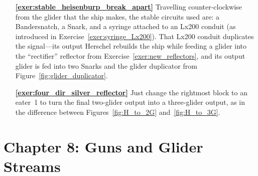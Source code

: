 \begin{multicols}{2}
\begin{itemize}[leftmargin=0em]
		
		\item[\bf\color{ocre}\sffamily\ref{exer:stable_heisenburp_break_apart}] Travelling counter-clockwise from the glider that the ship makes, the stable circuits used are: a Bandersnatch, a Snark, and a syringe attached to an Lx200 conduit (as introduced in Exercise~\ref{exer:syringe_Lx200}). That Lx200 conduit duplicates the signal---its output Herschel rebuilds the ship while feeding a glider into the ``rectifier'' reflector from Exercise~\ref{exer:new_reflectors}, and its output glider is fed into two Snarks and the glider duplicator from Figure~\ref{fig:glider_duplicator}.\\
		
		
		\item[\bf\color{ocre}\sffamily\ref{exer:four_dir_silver_reflector}] Just change the rightmost block to an eater~1 to turn the final two-glider output into a three-glider output, as in the difference between Figures~\ref{fig:H_to_2G} and~\ref{fig:H_to_3G}.\\
	\end{itemize}
\end{multicols}



\hypertarget{solutions_glider_guns}{}\label{solutions_glider_guns}
\section*{Chapter 8: Guns and Glider Streams}
\renewcommand{\chapterfolder}{glider_guns/}

